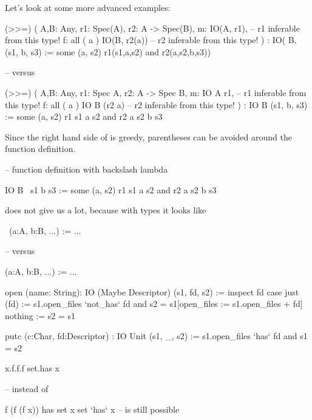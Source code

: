 Let's look at some more advanced examples:
%
\begin{alba}
  (>>=) ( A,B: Any, r1: Spec(A), r2: A -> Spec(B),
          m: IO(A, r1),       -- r1 inferable from this type!
          f: all ( a )
               IO(B, r2(a))   -- r2 inferable from this type!
        )
        : IO( B,
              (s1, b, s3) :=
                  some (a, s2)
                    r1(s1,a,s2) and
                    r2(a,s2,b,s3))

  -- versus

  (>>=) ( A,B: Any, r1: Spec A, r2: A -> Spec B,
          m: IO A r1,         -- r1 inferable from this type!
          f: all ( a )
               IO B (r2 a)    -- r2 inferable from this type!
        )
        : IO  B
              (s1, b, s3) :=
                  some (a, s2)
                    r1 s1 a s2 and
                    r2 a s2 b s3

\end{alba}
%
Since the right hand side of \code{:=} is greedy, parentheses can be avoided
around the function definition.
%
\begin{alba}
  -- function definition with backslash lambda

          IO  B
              \ s1 b s3 :=
                  some (a, s2)
                    r1 s1 a s2 and
                    r2 a s2 b s3
\end{alba}
%
does not give us a lot, because with types it looks like
%
\begin{alba}
  \ (a:A, b:B, ...) :=
        ...

  -- versus

  (a:A, b:B, ...) :=
        ...
\end{alba}


\begin{alba}
  open (name: String):
       IO (Maybe Descriptor)
          (s1, fd, s2) :=
             inspect fd case
                just (fd) :=
                   s1.open_files `not_has` fd
                   and
                   s2 = s1[open_files := s1.open_files + fd]
                nothing :=
                   s2 = s1

  putc (c:Char, fd:Descriptor)
       : IO Unit
            (s1, _, s2) :=
                s1.open_files `has` fd and
                s1 = s2
\end{alba}


\begin{alba}
  x.f.f.f                  set.has x

  -- instead of

  f (f (f x))              has set x
                           set `has` x
  -- is still possible
\end{alba}








